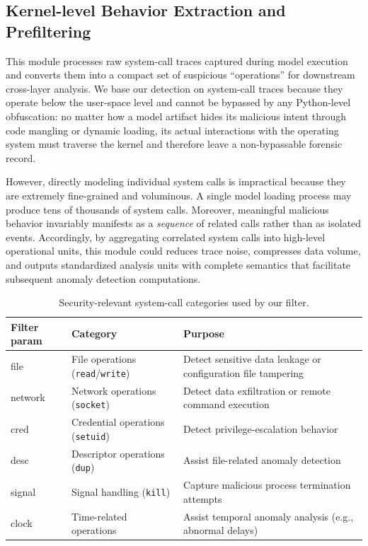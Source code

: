 \subsection{Kernel-level Behavior Extraction and Prefiltering}
This module processes raw system-call traces captured during model execution and converts them into a compact set of suspicious ``operations'' for downstream cross-layer analysis. We base our detection on system-call traces because they operate below the user-space level and cannot be bypassed by any Python-level obfuscation\cite{2875487}: no matter how a model artifact hides its malicious intent through code mangling or dynamic loading, its actual interactions with the operating system must traverse the kernel and therefore leave a non-bypassable forensic record.  

However, directly modeling individual system calls is impractical because they are extremely fine-grained and voluminous. A single model loading process may produce tens of thousands of system calls. Moreover, meaningful malicious behavior invariably manifests as a \emph{sequence} of related calls rather than as isolated events. Accordingly, by aggregating correlated system calls into high-level operational units, this module could reduces trace noise, compresses data volume, and outputs standardized analysis units with complete semantics that facilitate subsequent anomaly detection computations.

\begin{table}[htbp]
	\centering
	\caption{Security-relevant system-call categories used by our filter.}
	\begin{tabular}{l p{} p{}}
		\hline
		Filter param & Category & Purpose \\
		\hline
		file   & File operations (\texttt{read}/\texttt{write}) & Detect sensitive data leakage or configuration file tampering \\
		network & Network operations (\texttt{socket}) & Detect data exfiltration or remote command execution \\
		cred   & Credential operations (\texttt{setuid}) & Detect privilege-escalation behavior \\
		desc   & Descriptor operations (\texttt{dup}) & Assist file-related anomaly detection \\
		signal & Signal handling (\texttt{kill}) & Capture malicious process termination attempts \\
		clock  & Time-related operations & Assist temporal anomaly analysis (e.g., abnormal delays) \\
		\hline
	\end{tabular}
	\label{tab:syscalltypes}
\end{table}

